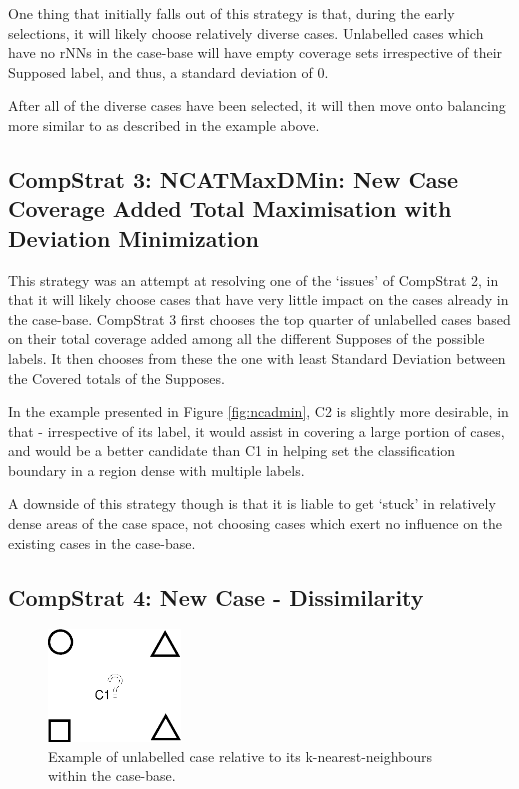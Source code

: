 \documentclass[a4paper,11pt]{report}
\begin{document}
One thing that initially falls out of this strategy is that, during the early selections, it will likely choose relatively diverse cases. Unlabelled cases which have no rNNs in the case-base will have empty coverage sets irrespective of their Supposed label, and thus, a standard deviation of 0.

After all of the diverse cases have been selected, it will then move onto balancing more similar to as described in the example above.

\subsection{CompStrat 3: NCATMaxDMin: New Case Coverage Added Total Maximisation with Deviation Minimization}
This strategy was an attempt at resolving one of the `issues' of CompStrat 2, in that it will likely choose cases that have very little impact on the cases already in the case-base.  CompStrat 3 first chooses the top quarter of unlabelled cases based on their total coverage added among all the different Supposes of the possible labels. It then chooses from these the one with least Standard Deviation between the Covered totals of the Supposes.

In the example presented in Figure \ref{fig:ncadmin}, C2 is slightly more desirable, in that - irrespective of its label, it would assist in covering a large portion of cases, and would be a better candidate than C1 in helping set the classification boundary in a region dense with multiple labels.

A downside of this strategy though is that it is liable to get `stuck' in relatively dense areas of the case space, not choosing cases which exert no influence on the existing cases in the case-base.

\subsection{CompStrat 4: New Case - Dissimilarity}
\begin{figure}[h!] \centering
\includegraphics[width=100pt]{./Drawn/NDATMin}
\caption{Example of unlabelled case relative to its k-nearest-neighbours within the case-base.}
\label{fig:ndatmin}
\end{figure}
\end{document}
